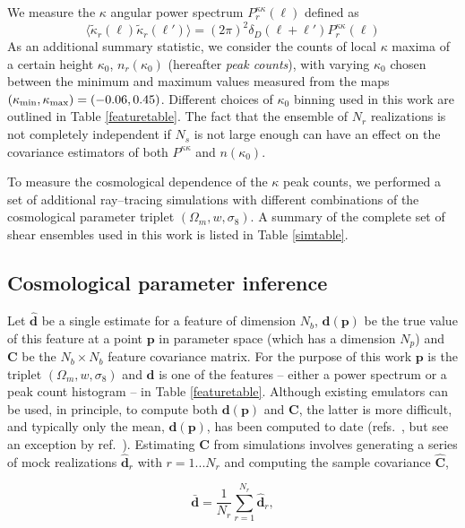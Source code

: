 \documentclass[reprint,aps,prd,superscriptaddress,showkeys,showpacs]{revtex4-1}
\newcommand{\bb}[1]{\mathbf{#1}}
\newcommand{\bbh}[1]{\mathbf{\hat{#1}}}
\begin{document}
We measure the $\kappa$ angular power spectrum $P^{\kappa\kappa}_r(\ell)$ defined as
\begin{equation}
\langle\tilde{\kappa}_r(\pmb{\ell})\tilde{\kappa}_r(\pmb{\ell}')\rangle = (2\pi)^2\delta_D(\pmb{\ell}+\pmb{\ell}')P^{\kappa\kappa}_r(\ell)
\end{equation}
%
As an additional summary statistic, we consider the counts of local
$\kappa$ maxima of a certain height $\kappa_0$, $n_r(\kappa_0)$
(hereafter \textit{peak counts}), with varying $\kappa_0$ chosen
between the minimum and maximum values measured from the maps
$(\kappa_{\rm min},\kappa_{\rm max})=(-0.06,0.45)$. Different choices
of $\kappa_0$ binning used in this work are outlined in Table
\ref{featuretable}.  The fact that the ensemble of $N_r$ realizations
is not completely independent if $N_s$ is not large enough can have an
effect on the covariance estimators of both $P^{\kappa\kappa}$ and
$n(\kappa_0)$.

To measure the cosmological dependence of the $\kappa$ peak counts, we
performed a set of additional ray--tracing simulations with different
combinations of the cosmological parameter triplet
$(\Omega_m,w,\sigma_8)$. A summary of the complete set of shear
ensembles used in this work is listed in Table \ref{simtable}.

\subsection{Cosmological parameter inference}
%
Let $\bbh{d}$ be a single estimate for a feature of dimension $N_b$,
$\bb{d}(\bb{p})$ be the true value of this feature at a point $\bb{p}$
in parameter space (which has a dimension $N_p$) and $\bb{C}$ be the
$N_b\times N_b$ feature covariance matrix. For the purpose of this
work $\bb{p}$ is the triplet $(\Omega_m,w,\sigma_8)$ and $\bb{d}$ is
one of the features -- either a power spectrum or a peak count
histogram -- in Table \ref{featuretable}. Although existing emulators
can be used, in principle, to compute both $\bb{d}(\bb{p})$ and
$\bb{C}$, the latter is more difficult, and typically only the mean,
$\bb{d}(\bb{p})$, has been computed to date
(refs.~\citep{coyote2,Nicaea}, but see an exception by
ref.~\citep{SchneiderKnoxCovariance}).  Estimating $\bb{C}$ from
simulations involves generating a series of mock realizations
$\bbh{d}_r$ with $r=1...N_r$ and computing the sample covariance
$\bbh{C}$,

\begin{equation}
\bb{\bar{d}} = \frac{1}{N_r}\sum_{r=1}^{N_r} \bbh{d}_r,
\end{equation}
\end{document}
